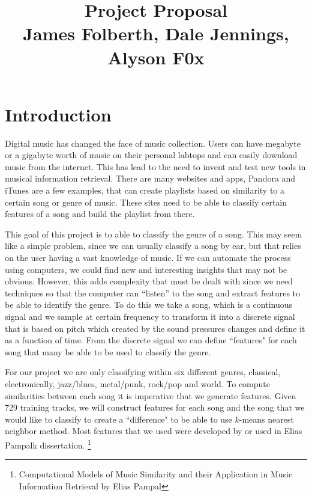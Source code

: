 \documentclass[12pt]{article}
\begin{document}
                                       
\title{Project Proposal\\
James Folberth, Dale Jennings, Alyson F0x}
\maketitle
\section{Introduction}
\indent Digital music has changed the face of music collection. Users can have megabyte or a gigabyte worth of music on their personal labtops and can easily download music from the internet. This has lead to the need to invent and test new tools in musical information retrieval. There are many websites and apps, Pandora and iTunes are a few examples, that can create playlists based on similarity to a certain song or genre of music. These sites need to be able to classify certain features of a song and build the playlist from there. 

\indent This goal of this project is to able to classify the genre of a song. This may seem like a simple problem, since we can usually classify a song by ear, but that relies on the user having a vast knowledge of music. If we can automate the process using computers, we could find new and interesting insights that may not be obvious. However, this adds complexity that must be dealt with since we need techniques so that  the computer can ``listen'' to the song and extract features to be able to identify the genre. To do this we take  a song, which is a continuous signal and we sample at certain frequency to transform it into a discrete signal that is based on pitch which created by the sound pressures changes  and define it as a function of time. From the discrete signal we can define  ``features" for each song that many be able to be used to classify the genre. 

\indent For our project we are only classifying within six different genres, classical, electronically, jazz/blues, metal/punk, rock/pop and world. To compute similarities between each song it is imperative that we generate features. Given 729 training tracks, we will construct features for each song and the song that we would like to classify to create a ``difference" to be able to use $k$-means nearest neighbor method. Most features that we used were developed by or used in Elias Pampalk dissertation. \footnote{Computational Models of Music Similarity and their Application in Music Information Retrieval by Elias Pampal } %
\indent
\end{document}
